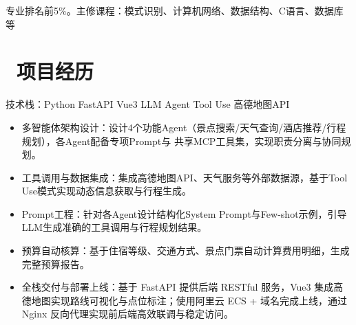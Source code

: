 \documentclass{resume} %
\begin{document}
	专业排名前5\%。主修课程：模式识别、计算机网络、数据结构、C语言、数据库等
	
	\section{\faBriefcase\ 项目经历}
	
	\large {技术栈：Python \textbullet{} FastAPI \textbullet{} Vue3 \textbullet{} LLM Agent \textbullet{} Tool Use
		\textbullet{} 高德地图API}
	\begin{itemize}
	    \item{多智能体架构设计}：设计4个功能Agent（景点搜索/天气查询/酒店推荐/行程规划），各Agent配备专项Prompt与
		共享MCP工具集，实现职责分离与协同规划。
		\item {工具调用与数据集成}：集成高德地图API、天气服务等外部数据源，基于Tool Use模式实现动态信息获取与行程生成。
		\item {Prompt工程}：针对各Agent设计结构化System Prompt与Few-shot示例，引导LLM生成准确的工具调用与行程规划结果。
		\item {预算自动核算}：基于住宿等级、交通方式、景点门票自动计算费用明细，生成完整预算报告。
		\item {全栈交付与部署上线}：基于 FastAPI 提供后端 RESTful 服务，Vue3 集成高德地图实现路线可视化与点位标注；使用阿里云 ECS + 域名完成上线，通过 Nginx 反向代理实现前后端高效联调与稳定访问。
	\end{itemize}
	
\end{document}
